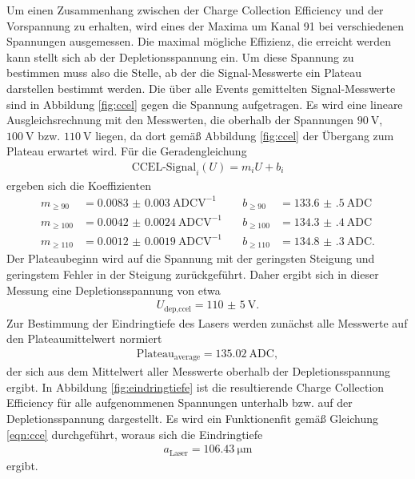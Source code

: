 Um einen Zusammenhang zwischen der Charge Collection Efficiency und der Vorspannung zu erhalten,
wird eines der Maxima um Kanal 91 bei verschiedenen Spannungen ausgemessen. Die maximal mögliche Effizienz,
die erreicht werden kann stellt sich ab der Depletionsspannung ein. Um diese Spannung zu bestimmen muss also
die Stelle, ab der die Signal-Messwerte ein Plateau darstellen bestimmt werden. Die über alle Events gemittelten
Signal-Messwerte sind in Abbildung \ref{fig:ccel} gegen die Spannung aufgetragen. Es wird eine lineare Ausgleichsrechnung
mit den Messwerten, die oberhalb der Spannungen $\SI{90}{\volt}$, $\SI{100}{\volt}$ bzw. $\SI{110}{\volt}$ liegen, da dort gemäß Abbildung \ref{fig:ccel}
der Übergang zum Plateau erwartet wird.
Für die Geradengleichung
\begin{align}
  \text{CCEL-Signal}_i(U) = m_i U + b_i
\end{align}
ergeben sich die Koeffizienten
\begin{align*}
  m_{\geq90}  &= \SI{0.0083(30)}{\text{ADC}\volt\tothe{-1}} &\quad b_{\geq90}  &= \SI{133.6(5)}{\text{ADC}} \\
  m_{\geq100} &= \SI{0.0042(24)}{\text{ADC}\volt\tothe{-1}} &\quad b_{\geq100} &= \SI{134.3(4)}{\text{ADC}} \\
  m_{\geq110} &= \SI{0.0012(19)}{\text{ADC}\volt\tothe{-1}} &\quad b_{\geq110} &= \SI{134.8(3)}{\text{ADC}}.
\end{align*}
Der Plateaubeginn wird auf die Spannung mit der geringsten Steigung und geringstem Fehler in der Steigung zurückgeführt.
Daher ergibt sich in dieser Messung eine Depletionsspannung von etwa
\begin{align}
  U_\text{dep,ccel} = \SI{110(5)}{\volt}.
\end{align}
Zur Bestimmung der Eindringtiefe des Lasers werden zunächst alle Messwerte auf den Plateaumittelwert normiert
\begin{align}
  \text{Plateau}_\text{average} = \SI{135.02}{\text{ADC}},
\end{align}
der sich aus dem Mittelwert aller Messwerte oberhalb der Depletionsspannung ergibt.
In Abbildung \ref{fig:eindringtiefe} ist die resultierende Charge Collection Efficiency für alle aufgenommenen Spannungen unterhalb bzw.
auf der Depletionsspannung dargestellt. Es wird ein Funktionenfit gemäß Gleichung \eqref{eqn:cce} durchgeführt, woraus sich
die Eindringtiefe
\begin{align}
  a_\text{Laser} = \SI{106.43}{\micro\meter}
\end{align}
ergibt.

